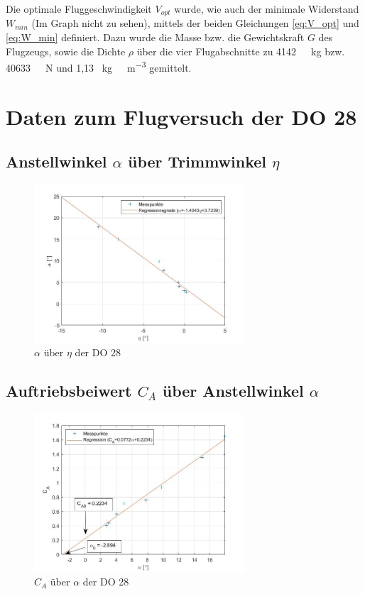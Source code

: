 Die optimale Fluggeschwindigkeit $V_{opt}$ wurde, wie auch der minimale Widerstand $W_{min}$ (Im Graph nicht zu sehen), mittels der beiden Gleichungen \ref{eq:V_opt} und \ref{eq:W_min} definiert. Dazu wurde die Masse bzw. die Gewichtskraft $G$ des Flugzeugs, sowie die Dichte $\rho$ über die vier Flugabschnitte zu \SI{4142}{\ \kilogram} bzw. \SI{40633}{\ \newton} und 1,13 \SI{}{\kilogram\ \meter^{-3}} gemittelt.

\section{Daten zum Flugversuch der DO 28}

\subsection{Anstellwinkel $\alpha$ über Trimmwinkel $\eta$}

\begin{figure}[H]
	\centering	\includegraphics[width=0.7\textwidth]{./Bilder/alpha_eta_plot.jpg}
	\caption{$\alpha$ über $\eta$ der DO 28}
	\label{fig:alpha_eta_DO28}
\end{figure}

\subsection{Auftriebsbeiwert $C_{A}$ über Anstellwinkel $\alpha$}

\begin{figure}[H]
	\centering	\includegraphics[width=0.7\textwidth]{./Bilder/CA_alpha_plot.jpg}
	\caption{$C_{A}$ über $\alpha$ der DO 28}
	\label{fig:CA_alpha_DO28}
\end{figure}

